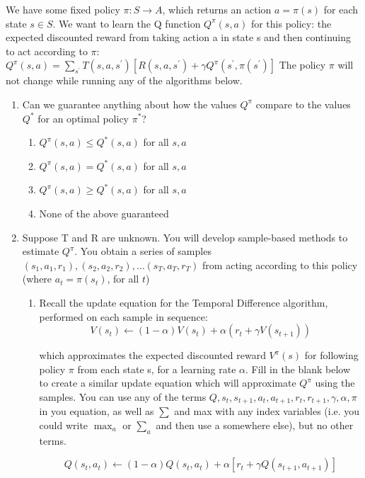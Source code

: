 \documentclass[11pt, answers]{exam}
\begin{document}
We have some fixed policy $\pi: S \rightarrow A$, which returns an action $a=\pi(s)$ for each state $s \in S$. We want to learn the Q function $Q^{\pi}(s, a)$ for this policy: the expected discounted reward from taking action a in state s and then
continuing to act according to $\pi$:$Q^{\pi}(s, a)=\sum_{s^{\prime}} T\left(s, a, s^{\prime}\right)\left[R\left(s, a, s^{\prime}\right)+\gamma Q^{\pi}\left(s^{\prime}, \pi\left(s^{\prime}\right)\right]\right.$ The policy $\pi$ will not change
while running any of the algorithms below.
\begin{enumerate}
\item Can we guarantee anything about how the values $Q^{\pi}$ compare to the values $Q^{*}$ for an optimal policy $\pi^{*}$?
\begin{enumerate}
\item $Q^{\pi}(s, a) \leq Q^{*}(s, a)$ for all $s,a$
\item $Q^{\pi}(s, a) = Q^{*}(s, a)$ for all $s,a$
\item $Q^{\pi}(s, a) \geq Q^{*}(s, a)$ for all $s,a$
\item None of the above guaranteed
\end{enumerate}

\item Suppose T and R are unknown. You will develop sample-based methods to estimate $Q^{\pi}$. You obtain a series of samples $\left(s_{1}, a_{1}, r_{1}\right),\left(s_{2}, a_{2}, r_{2}\right), \ldots\left(s_{T}, a_{T}, r_{T}\right)$ from acting according to this policy (where $a_t = \pi(s_t)$, for all $t$)
\begin{enumerate}
\item Recall the update equation for the Temporal Difference algorithm, performed on each sample in sequence:
$$V\left(s_{t}\right) \leftarrow(1-\alpha) V\left(s_{t}\right)+\alpha\left(r_{t}+\gamma V\left(s_{t+1}\right)\right)$$

which approximates the expected discounted reward $V^{\pi}(s)$ for following policy $\pi$ from each state s, for a learning rate $\alpha$.
Fill in the blank below to create a similar update equation which will approximate $Q^{\pi}$  using the samples.
You can use any of the terms $Q, s_{t}, s_{t+1}, a_{t}, a_{t+1}, r_{t}, r_{t+1}, \gamma, \alpha, \pi$ in you equation, as well as $\sum$ and max
with any index variables (i.e. you could write $\max _{a}$ or $\sum_{a}$ and then use a somewhere else), but no other terms.

$$Q\left(s_{t}, a_{t}\right) \leftarrow(1-\alpha) Q\left(s_{t}, a_{t}\right)+\alpha[r_t+\gamma Q(s_{t+1},a_{t+1})]$$


\end{enumerate}
\end{enumerate}
\end{document}
